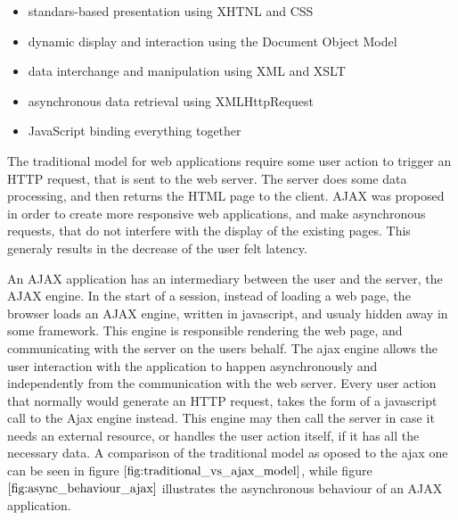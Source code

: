 \begin{itemize}
\item standars-based presentation using XHTNL and CSS
\item dynamic display and interaction using the Document Object Model
\item data interchange and manipulation using XML and XSLT
\item asynchronous data retrieval using XMLHttpRequest
\item JavaScript binding everything together
\end{itemize}

The traditional model for web applications require some user action
to trigger an HTTP request, that is sent to the web server. The server
does some data processing, and then returns the HTML page to the client.
AJAX was proposed in order to create more responsive web applications,
and make asynchronous requests, that do not interfere with the display
of the existing pages. This generaly results in the decrease of the user felt latency.


An AJAX application has an intermediary between
the user and the server, the AJAX engine. In the start of a session,
instead of loading a web page, the browser loads an AJAX engine, written in javascript,
and usualy hidden away in some framework. This engine is responsible
rendering the web page, and communicating with the server on the users behalf.
The ajax engine allows the user interaction with the application
to happen asynchronously and independently from the communication with the web server.
Every user action that normally would generate an HTTP request, takes
the form of a javascript call to the Ajax engine instead. This engine
may then call the server in case it needs an external resource, or handles
the user action itself, if it has all the necessary data.
A comparison of the traditional model as oposed to the ajax one can be seen
in figure $\ref{fig:traditional_vs_ajax_model}$, while figure $\ref{fig:async_behaviour_ajax}$
illustrates the asynchronous behaviour of an AJAX application.

